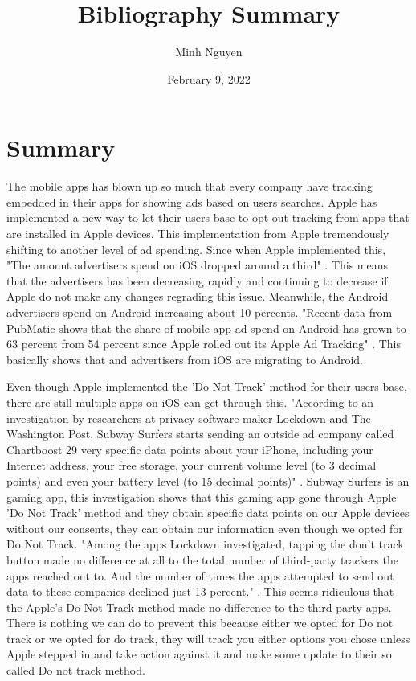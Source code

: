 \documentclass{article}
\title{Bibliography Summary}
\author{Minh Nguyen}
\date{February 9, 2022}
\begin{document}
\maketitle

\section*{Summary}
The mobile apps has blown up so much that every company have tracking embedded in their apps for showing ads based on users searches. Apple has implemented a new way to let their users base to opt out tracking from apps that are installed in Apple devices. This implementation from Apple tremendously shifting to another level of ad spending. Since when Apple implemented this, "The amount advertisers spend on iOS dropped around a third" \cite{oconnor2021}. This means that the advertisers has been decreasing rapidly and continuing to decrease if Apple do not make any changes regrading this issue. Meanwhile, the Android advertisers spend on Android increasing about 10 percents. "Recent data from PubMatic shows that the share of mobile app ad spend on Android has grown to 63 percent from 54 percent since Apple rolled out its Apple Ad Tracking" \cite{oconnor2021}. This basically shows that and advertisers from iOS are migrating to Android.

\medskip

Even though Apple implemented the 'Do Not Track' method for their users base, there are still multiple apps on iOS can get through this. "According to an investigation by researchers at privacy software maker Lockdown and The Washington Post. Subway Surfers starts sending an outside ad company called Chartboost 29 very specific data points about your iPhone, including your Internet address, your free storage, your current volume level (to 3 decimal points) and even your battery level (to 15 decimal points)" \cite{ran2021}. Subway Surfers is an gaming app, this investigation shows that this gaming app gone through Apple 'Do Not Track' method and they obtain specific data points on our Apple devices without our consents, they can obtain our information even though we opted for Do Not Track. "Among the apps Lockdown investigated, tapping the don’t track button made no difference at all to the total number of third-party trackers the apps reached out to. And the number of times the apps attempted to send out data to these companies declined just 13 percent." \cite{ran2021}. This seems ridiculous that the Apple's Do Not Track method made no difference to the third-party apps. There is nothing we can do to prevent this because either we opted for Do not track or we opted for do track, they will track you either options you chose unless Apple stepped in and take action against it and make some update to their so called Do not track method.

\printbibliography
\end{document}
